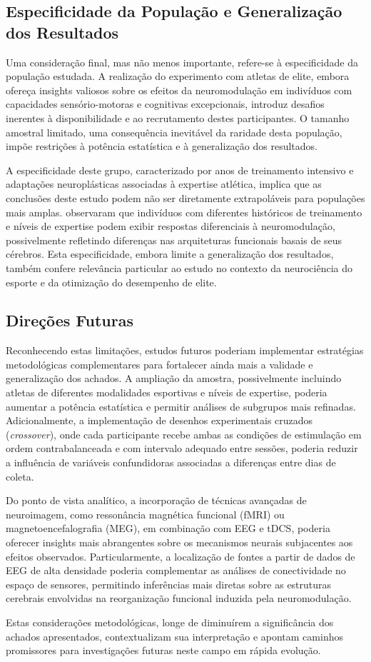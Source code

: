 \subsection{Especificidade da População e Generalização dos Resultados}
Uma consideração final, mas não menos importante, refere-se à especificidade da população estudada. A realização do experimento com atletas de elite, embora ofereça insights valiosos sobre os efeitos da neuromodulação em indivíduos com capacidades sensório-motoras e cognitivas excepcionais, introduz desafios inerentes à disponibilidade e ao recrutamento destes participantes. O tamanho amostral limitado, uma consequência inevitável da raridade desta população, impõe restrições à potência estatística e à generalização dos resultados.

A especificidade deste grupo, caracterizado por anos de treinamento intensivo e adaptações neuroplásticas associadas à expertise atlética, implica que as conclusões deste estudo podem não ser diretamente extrapoláveis para populações mais amplas. \cite{singh2024evaluating} observaram que indivíduos com diferentes históricos de treinamento e níveis de expertise podem exibir respostas diferenciais à neuromodulação, possivelmente refletindo diferenças nas arquiteturas funcionais basais de seus cérebros. Esta especificidade, embora limite a generalização dos resultados, também confere relevância particular ao estudo no contexto da neurociência do esporte e da otimização do desempenho de elite.

\subsection{Direções Futuras}
Reconhecendo estas limitações, estudos futuros poderiam implementar estratégias metodológicas complementares para fortalecer ainda mais a validade e generalização dos achados. A ampliação da amostra, possivelmente incluindo atletas de diferentes modalidades esportivas e níveis de expertise, poderia aumentar a potência estatística e permitir análises de subgrupos mais refinadas. Adicionalmente, a implementação de desenhos experimentais cruzados (\textit{crossover}), onde cada participante recebe ambas as condições de estimulação em ordem contrabalanceada e com intervalo adequado entre sessões, poderia reduzir a influência de variáveis confundidoras associadas a diferenças entre dias de coleta.

Do ponto de vista analítico, a incorporação de técnicas avançadas de neuroimagem, como ressonância magnética funcional (fMRI) ou magnetoencefalografia (MEG), em combinação com EEG e tDCS, poderia oferecer insights mais abrangentes sobre os mecanismos neurais subjacentes aos efeitos observados. Particularmente, a localização de fontes a partir de dados de EEG de alta densidade poderia complementar as análises de conectividade no espaço de sensores, permitindo inferências mais diretas sobre as estruturas cerebrais envolvidas na reorganização funcional induzida pela neuromodulação.

Estas considerações metodológicas, longe de diminuírem a significância dos achados apresentados, contextualizam sua interpretação e apontam caminhos promissores para investigações futuras neste campo em rápida evolução.